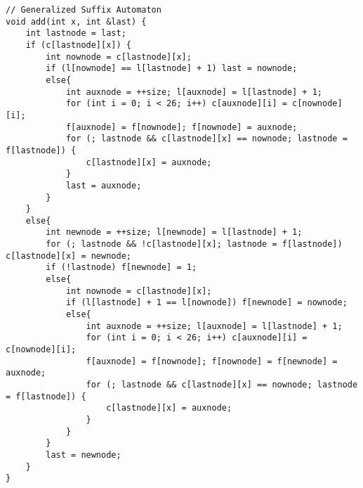\begin{lstlisting}
// Generalized Suffix Automaton
void add(int x, int &last) {
	int lastnode = last;
	if (c[lastnode][x]) {
		int nownode = c[lastnode][x];
		if (l[nownode] == l[lastnode] + 1) last = nownode;
		else{
			int auxnode = ++size; l[auxnode] = l[lastnode] + 1;
			for (int i = 0; i < 26; i++) c[auxnode][i] = c[nownode][i];
			f[auxnode] = f[nownode]; f[nownode] = auxnode;
			for (; lastnode && c[lastnode][x] == nownode; lastnode = f[lastnode]) {
				c[lastnode][x] = auxnode;
			}
			last = auxnode;
		}
	}
	else{
		int newnode = ++size; l[newnode] = l[lastnode] + 1;
		for (; lastnode && !c[lastnode][x]; lastnode = f[lastnode]) c[lastnode][x] = newnode;
		if (!lastnode) f[newnode] = 1;
		else{
			int nownode = c[lastnode][x];
			if (l[lastnode] + 1 == l[nownode]) f[newnode] = nownode;
			else{
				int auxnode = ++size; l[auxnode] = l[lastnode] + 1;
				for (int i = 0; i < 26; i++) c[auxnode][i] = c[nownode][i];
				f[auxnode] = f[nownode]; f[nownode] = f[newnode] = auxnode;
				for (; lastnode && c[lastnode][x] == nownode; lastnode = f[lastnode]) {
					c[lastnode][x] = auxnode;
				}
			}
		}
		last = newnode;
	}
}
\end{lstlisting}
